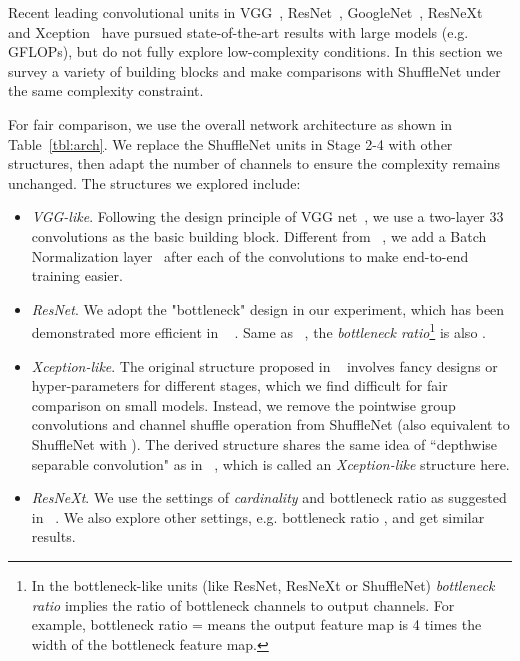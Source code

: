 \documentclass[10pt,twocolumn,letterpaper]{article}
\begin{document}
Recent leading convolutional units in VGG~\cite{simonyan2014very}, ResNet~\cite{he2016deep}, GoogleNet~\cite{szegedy2015going}, ResNeXt~\cite{xie2016aggregated} and Xception~\cite{chollet2016xception} have pursued state-of-the-art results with large models (e.g. GFLOPs), but do not fully explore low-complexity conditions. In this section we survey a variety of building blocks and make comparisons with ShuffleNet under the same complexity constraint.

For fair comparison, we use the overall network architecture as shown in Table~\ref{tbl:arch}. We replace the ShuffleNet units in Stage 2-4 with other structures, then adapt the number of channels to ensure the complexity remains unchanged. The structures we explored include:

\begin{itemize}

	\item \emph{VGG-like}. Following the design principle of VGG net~\cite{simonyan2014very}, we use a two-layer 33 convolutions as the basic building block. Different from ~\cite{simonyan2014very}, we add a Batch Normalization layer~\cite{ioffe2015batch} after each of the convolutions to make end-to-end training easier.
		
	\item \emph{ResNet}. We adopt the "bottleneck" design in our experiment, which has been demonstrated more efficient in ~\cite{he2016deep} . Same as ~\cite{he2016deep}, the \emph{bottleneck ratio}\footnote{In the bottleneck-like units (like ResNet, ResNeXt or ShuffleNet) \emph{bottleneck ratio} implies the ratio of bottleneck channels to output channels. For example, bottleneck ratio =  means the output feature map is 4 times the width of the bottleneck feature map. } is also . 
	
	\item \emph{Xception-like}. The original structure proposed in ~\cite{chollet2016xception} involves fancy designs or hyper-parameters for different stages, which we find difficult for fair comparison on small models. Instead, we remove the pointwise group convolutions and channel shuffle operation from ShuffleNet (also equivalent to ShuffleNet with ). The derived structure shares the same idea of ``depthwise separable convolution" as in ~\cite{chollet2016xception}, which is called an \emph{Xception-like} structure here.
	
	\item \emph{ResNeXt}. We use the settings of \emph{cardinality}  and bottleneck ratio  as suggested in ~\cite{xie2016aggregated}. We also explore other settings, e.g. bottleneck ratio , and get similar results.
	
\end{itemize}
\end{document}
